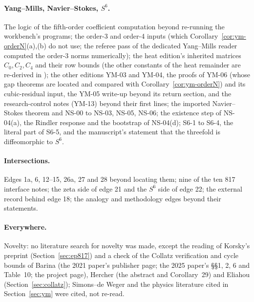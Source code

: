 \paragraph{Yang--Mills, Navier--Stokes, $S^6$.} The logic of the fifth-order coefficient computation beyond re-running the workbench's programs; the order-3 and order-4 inputs (which Corollary~\ref{cor:ym-orderN}(a),(b) do not use; the referee pass of the dedicated Yang--Mills reader computed the order-3 norms numerically); the heat edition's inherited matrices $C_0,C_2,C_4$ and their row bounds (the other constants of the heat remainder are re-derived in \cite{YMReader}); the other editions YM-03 and YM-04, the proofs of YM-06 (whose gap theorems are located and compared with Corollary~\ref{cor:ym-orderN}) and its cubic-residual input, the YM-05 write-up beyond its return section, and the research-control notes (YM-13) beyond their first lines; the imported Navier--Stokes theorem and NS-00 to NS-03, NS-05, NS-06; the existence step of NS-04(a), the Rindler response and the bootstrap of NS-04(d); S6-1 to S6-4, the literal part of S6-5, and the manuscript's statement that the threefold is diffeomorphic to $S^6$.

\paragraph{Intersections.} Edges 1a, 6, 12--15, 26a, 27 and 28 beyond locating them; nine of the ten 817 interface notes; the zeta side of edge 21 and the $S^6$ side of edge 22; the external record behind edge 18; the analogy and methodology edges beyond their statements.

\paragraph{Everywhere.} Novelty: no literature search for novelty was made, except the reading of Korsky's preprint (Section~\ref{sec:ep817}) and a check of the Collatz verification and cycle bounds of Barina (the 2021 paper's publisher page; the 2025 paper's §§1, 2, 6 and Table~10; the project page), Hercher (the abstract and Corollary~29) and Eliahou (Section~\ref{sec:collatz}); Simons--de Weger and the physics literature cited in Section~\ref{sec:ym} were cited, not re-read.

